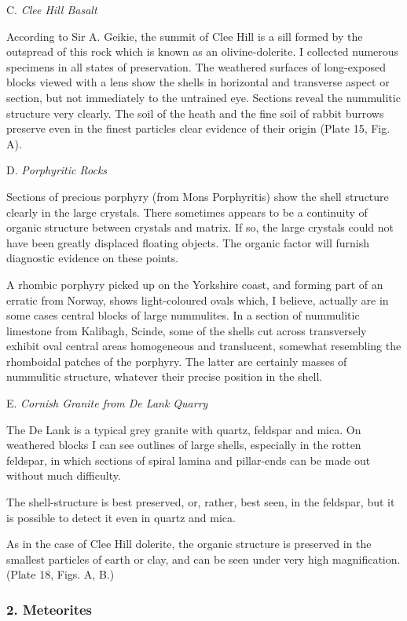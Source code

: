 \documentclass[a4paper, 12pt, oneside]{article}
\begin{document}
\bigskip
\centerline{C. \emph{Clee Hill Basalt}}

According to Sir A. Geikie, the summit of Clee Hill is a sill formed by the outspread of this rock which is known as an olivine-dolerite. I collected numerous specimens in all states of preservation. The weathered surfaces of long-exposed blocks viewed with a lens show the shells in horizontal and transverse aspect or section, but not immediately to the untrained eye. Sections reveal the nummulitic structure very clearly. The soil of the heath and the fine soil of rabbit burrows preserve even in the finest particles clear evidence of their origin (Plate 15, Fig. A).

\bigskip
\centerline{D. \emph{Porphyritic Rocks}}

Sections of precious porphyry (from Mons Porphyritis) show the shell structure clearly in the large crystals. There sometimes appears to be a continuity of organic structure between crystals and matrix. If so, the large crystals could not have been greatly displaced floating objects. The organic factor will furnish diagnostic evidence on these points.

A rhombic porphyry picked up on the Yorkshire coast, and forming part of an erratic from Norway, shows light-coloured ovals which, I believe, actually are in some cases central blocks of large nummulites. In a section of nummulitic limestone from Kalibagh, Scinde, some of the shells cut across transversely exhibit oval central areas homogeneous and translucent, somewhat resembling the rhomboidal patches of the porphyry. The latter are certainly masses of nummulitic structure, whatever their precise position in the shell.

\bigskip
\centerline{E. \emph{Cornish Granite from De Lank Quarry}}

The De Lank is a typical grey granite with quartz, feldspar and mica. On weathered blocks I can see outlines of large shells, especially in the rotten feldspar, in which sections of spiral lamina and pillar-ends can be made out without much difficulty.

The shell-structure is best preserved, or, rather, best seen, in the feldspar, but it is possible to detect it even in quartz and mica.

As in the case of Clee Hill dolerite, the organic structure is preserved in the smallest particles of earth or clay, and can be seen under very high magnification. (Plate 18, Figs. A, B.)

\subsubsection{2. Meteorites}
\end{document}
